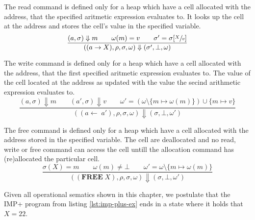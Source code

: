 The read command is defined only for a heap which have a cell allocated with the address, that the specified aritmetic expression evaluates to. It looks up the cell at the address and stores the cell's value in the specified variable.
\begin{equation}
\frac
{(a,\sigma) \Downarrow m \qquad \omega(m)=v \qquad \sigma'=\sigma[\sfrac{X}{v}]}
{((a \rightarrow X), \rho, \sigma, \omega) \Downarrow (\sigma', \bot, \omega)}
\end{equation}

The write command is defined only for a heap which have a cell allocated with the address, that the first specified aritmetic expression evaluates to. The value of the cell located at the address as updated with the value the secind arithmetic expression evaluates to.
\begin{equation}
\frac
{(a,\sigma)\Downarrow m \qquad (a',\sigma)\Downarrow v \qquad \omega'=(\omega\setminus\{m\mapsto\omega(m)\})\cup\{m\mapsto v\}}
{((a\leftarrow\;a'), \rho, \sigma, \omega) \Downarrow (\sigma, \bot, \omega')}
\end{equation}

The free command is defined only for a heap which have a cell allocated with the address stored in the specified variable. The cell are deallocated and no read, write or free command can access the cell untill the allocation command has (re)allocated the particular cell.
\begin{equation}
\frac
{\sigma(X)=m \qquad \omega(m)\neq\bot \qquad \omega'=\omega\setminus\{m\mapsto\omega(m)\}}
{((\textbf{FREE}\;X), \rho, \sigma, \omega) \Downarrow (\sigma, \bot, \omega')}
\end{equation}

\begin{prop}\label{prop:program-correct}
Given all operational sematics shown in this chapter, we postulate that the IMP+ program from listing \ref{lst:imp-plus-ex} ends in a state where it holds that $X = 22$.
\end{prop}
